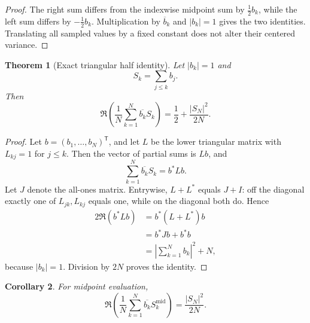 \documentclass[11pt]{amsart}
\numberwithin{equation}{section}
\theoremstyle{plain}
\newtheorem{theorem}{Theorem}[section]
\newtheorem{corollary}[theorem]{Corollary}
\theoremstyle{definition}
\theoremstyle{remark}
\newcommand{\1}{\mathbf{1}}
\begin{document}
\begin{proof}
The right sum differs from the indexwise midpoint sum by
\(\frac12b_k\), while the left sum differs by \(-\frac12b_k\).
Multiplication by \(\overline b_k\) and \(|b_k|=1\) gives the two
identities.  Translating all sampled values by a fixed constant does not
alter their centered variance.
\end{proof}

\begin{theorem}[Exact triangular half identity]
\label{thm:triangular_half}
Let \(|b_k|=1\) and
\begin{equation}
S_k=\sum_{j\leq k}b_j.
\label{eq:triangular_partial_sums}
\end{equation}
Then
\begin{equation}
\boxed{
\Re\left(
\frac1N\sum_{k=1}^N\overline{b_k}S_k
\right)
=
\frac12+\frac{|S_N|^2}{2N}.
}
\label{eq:triangular_half_identity}
\end{equation}
\end{theorem}

\begin{proof}
Let \(b=(b_1,\ldots,b_N)^{\mathsf T}\), and let \(L\) be the lower
triangular matrix with \(L_{kj}=1\) for \(j\leq k\).  Then the vector of
partial sums is \(Lb\), and
\begin{equation}
\sum_{k=1}^{N}\overline{b_k}S_k
=
b^\ast Lb.
\label{eq:triangular_form_detailed}
\end{equation}
Let \(J\) denote the all-ones matrix.  Entrywise, \(L+L^\ast\) equals
\(J+I\): off the diagonal exactly one of \(L_{jk},L_{kj}\) equals one,
while on the diagonal both do.  Hence
\begin{align}
2\Re(b^\ast Lb)
&=
b^\ast(L+L^\ast)b
\label{eq:triangular_real_part_one}
\\
&=
b^\ast Jb+b^\ast b
\label{eq:triangular_real_part_two}
\\
&=
\left|\sum_{k=1}^{N}b_k\right|^2+N,
\label{eq:triangular_real_part_three}
\end{align}
because \(|b_k|=1\).  Division by \(2N\) proves the identity.
\end{proof}

\begin{corollary}
\label{cor:midpoint_triangular}
For midpoint evaluation,
\begin{equation}
\Re\left(
\frac1N\sum_{k=1}^N
\overline{b_k}S_k^{\mathrm{mid}}
\right)
=
\frac{|S_N|^2}{2N}.
\label{eq:midpoint_triangular}
\end{equation}
\end{corollary}
\end{document}
